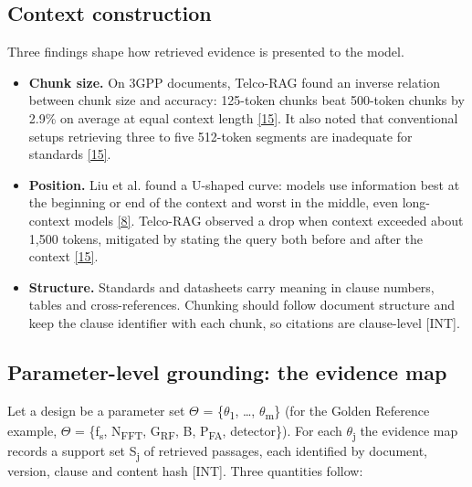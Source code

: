 \documentclass[11pt,a4paper]{article}
\newcommand{\prov}[1]{\textsf{\footnotesize[#1]}}
\begin{document}
\subsection{Context construction}
Three findings shape how retrieved evidence is presented to the model.

\begin{itemize}
\item \textbf{Chunk size.} On 3GPP documents, Telco-RAG found an inverse relation between chunk size and accuracy: 125-token chunks beat 500-token chunks by 2.9\% on average at equal context length \hyperlink{ref15}{[15]}. It also noted that conventional setups retrieving three to five 512-token segments are inadequate for standards \hyperlink{ref15}{[15]}.
\item \textbf{Position.} Liu et al. found a U-shaped curve: models use information best at the beginning or end of the context and worst in the middle, even long-context models \hyperlink{ref8}{[8]}. Telco-RAG observed a drop when context exceeded about 1,500 tokens, mitigated by stating the query both before and after the context \hyperlink{ref15}{[15]}.
\item \textbf{Structure.} Standards and datasheets carry meaning in clause numbers, tables and cross-references. Chunking should follow document structure and keep the clause identifier with each chunk, so citations are clause-level \prov{INT}.
\end{itemize}
\subsection{Parameter-level grounding: the evidence map}
Let a design be a parameter set \ensuremath{\Theta} = \{\ensuremath{\theta}\textsubscript{1}, \ldots{}, \ensuremath{\theta}\textsubscript{m}\} (for the Golden Reference example, \ensuremath{\Theta} = \{f\textsubscript{s}, N\textsubscript{FFT}, G\textsubscript{RF}, B, P\textsubscript{FA}, detector\}). For each \ensuremath{\theta}\textsubscript{j} the evidence map records a support set S\textsubscript{j} of retrieved passages, each identified by document, version, clause and content hash \prov{INT}. Three quantities follow:
\end{document}
